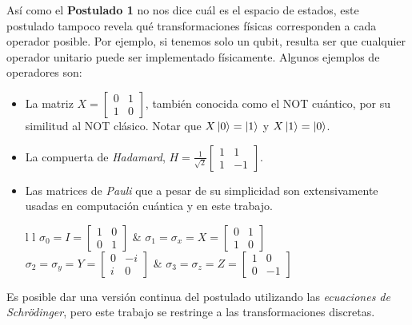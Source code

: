 Así como el \textbf{Postulado 1} no nos dice cuál es el espacio de estados, este postulado tampoco revela qué transformaciones físicas corresponden a cada operador posible. Por ejemplo, si tenemos solo un qubit, resulta ser que cualquier operador unitario puede ser implementado físicamente.
Algunos ejemplos de operadores son:
\begin{itemize}
    \item La matriz \(X=\begin{bmatrix}
        0 & 1 \\
        1 & 0
    \end{bmatrix}\), también conocida como el \textsf{NOT} cuántico, por su similitud al \textsf{NOT} clásico. Notar que $X\ket{0} = \ket{1}$ y $X\ket{1} = \ket{0}$.
    \item La compuerta de \emph{Hadamard}, \(H=\frac{1}{\sqrt{2}}\begin{bmatrix}
        1 & 1 \\
        1 & -1
    \end{bmatrix}\).
    \item Las matrices de \emph{Pauli} que a pesar de su simplicidad son extensivamente usadas en computación cuántica y en este trabajo.
    \begin{center}
    \begin{tabular}{l l }
\(\sigma_0 = I  = \begin{bmatrix}
        1 & 0 \\
        0 & 1
    \end{bmatrix}\) & \(\sigma_1 = \sigma_x  = X = \begin{bmatrix}
        0 & 1 \\
        1 & 0
    \end{bmatrix}\) \\
\(\sigma_2 = \sigma_y = Y = \begin{bmatrix}
        0 & -i \\
        i & 0
    \end{bmatrix}\) & \(\sigma_3 = \sigma_z = Z = \begin{bmatrix}
        1 & 0 \\
        0 & -1
    \end{bmatrix}\) \\
\end{tabular}
    \end{center}
\end{itemize}

Es posible dar una versión continua del postulado utilizando las \emph{ecuaciones de Schrödinger}, pero este trabajo se restringe a las transformaciones discretas.

